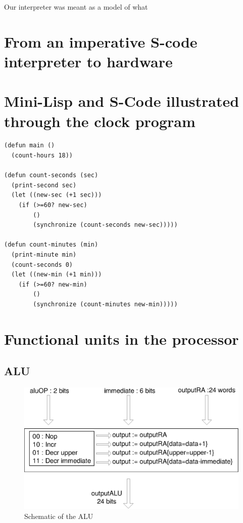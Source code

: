 \documentclass[a4paper, 11pt]{article}
\begin{document}
Our interpreter was meant as a model of what 

\section{From an imperative S-code interpreter to hardware}




\newpage
\appendix

\section{Mini-Lisp and S-Code illustrated through the clock program}


\begin{lstlisting}
(defun main ()
  (count-hours 18))

(defun count-seconds (sec)
  (print-second sec)
  (let ((new-sec (+1 sec)))
    (if (>=60? new-sec)
        ()  
        (synchronize (count-seconds new-sec)))))

(defun count-minutes (min)
  (print-minute min)
  (count-seconds 0)
  (let ((new-min (+1 min)))
    (if (>=60? new-min)
        ()  
        (synchronize (count-minutes new-min)))))
\end{lstlisting}

\newpage
\section{Functional units in the processor}
\subsection{ALU}
\begin{figure}[h]
\center
\caption{Schematic of the ALU}
   \includegraphics[scale=0.5]{ALU.eps}
\end{figure}
\end{document}
